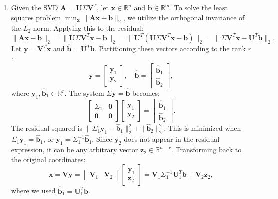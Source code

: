 \begin{solution}
\begin{enumerate}
\item[(a)] Given the SVD $\mathbf{A} = \mathbf{U} \Sigma \mathbf{V}^T$, let $\mathbf{x} \in \mathbb{R}^n$ and $\mathbf{b} \in \mathbb{R}^m$. To solve the least squares problem $\min_{\mathbf{x}} \|\mathbf{Ax} - \mathbf{b}\|_2$, we utilize the orthogonal invariance of the $L_2$ norm. 
Applying this to the residual:
\[
\|\mathbf{A x} - \mathbf{b}\|_2 = \|\mathbf{U} \Sigma \mathbf{V}^T \mathbf{x} - \mathbf{b}\|_2 = \|\mathbf{U}^T (\mathbf{U} \Sigma \mathbf{V}^T \mathbf{x} - \mathbf{b})\|_2 = \|\Sigma \mathbf{V}^T \mathbf{x} - \mathbf{U}^T \mathbf{b}\|_2.
\]
Let $\mathbf{y} = \mathbf{V}^T \mathbf{x}$ and $\hat{\mathbf{b}} = \mathbf{U}^T \mathbf{b}$. Partitioning these vectors according to the rank $r$:
\[
\mathbf{y} = \begin{bmatrix} \mathbf{y}_1 \\ \mathbf{y}_2 \end{bmatrix}, \quad \hat{\mathbf{b}} = \begin{bmatrix} \hat{\mathbf{b}}_1 \\ \hat{\mathbf{b}}_2 \end{bmatrix},
\]
where $\mathbf{y}_1, \hat{\mathbf{b}}_1 \in \mathbb{R}^r$. The system $\Sigma \mathbf{y} = \hat{\mathbf{b}}$ becomes:
\[
\begin{bmatrix} \Sigma_1 & \mathbf{0} \\ \mathbf{0} & \mathbf{0} \end{bmatrix} \begin{bmatrix} \mathbf{y}_1 \\ \mathbf{y}_2 \end{bmatrix} = \begin{bmatrix} \hat{\mathbf{b}}_1 \\ \hat{\mathbf{b}}_2 \end{bmatrix}.
\]
The residual squared is $\|\Sigma_1 \mathbf{y}_1 - \hat{\mathbf{b}}_1\|_2^2 + \|\hat{\mathbf{b}}_2\|_2^2$. This is minimized when $\Sigma_1 \mathbf{y}_1 = \hat{\mathbf{b}}_1$, or $\mathbf{y}_1 = \Sigma_1^{-1} \hat{\mathbf{b}}_1$. Since $\mathbf{y}_2$ does not appear in the residual expression, it can be any arbitrary vector $\mathbf{z}_2 \in \mathbb{R}^{n-r}$.
Transforming back to the original coordinates:
\[
\mathbf{x} = \mathbf{V} \mathbf{y} = \begin{bmatrix} \mathbf{V}_1 & \mathbf{V}_2 \end{bmatrix} \begin{bmatrix} \mathbf{y}_1 \\ \mathbf{z}_2 \end{bmatrix} = \mathbf{V}_1 \Sigma_1^{-1} \mathbf{U}_1^T \mathbf{b} + \mathbf{V}_2 \mathbf{z}_2,
\]
where we used $\hat{\mathbf{b}}_1 = \mathbf{U}_1^T \mathbf{b}$.


\end{enumerate}
\end{solution}
